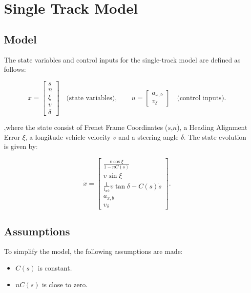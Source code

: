 \chapter{Single Track Model} \label{ch:sin_tra_mod}

\section{Model}

The state variables and control inputs for the single-track model are defined as follows:

\[
	x = \begin{bmatrix}
		s \\ n \\ \xi \\ v \\ \delta
	\end{bmatrix}
	\quad \text{(state variables)},
	\qquad
	u = \begin{bmatrix}
		a_{x,b} \\ v_\delta
	\end{bmatrix}
	\quad \text{(control inputs)}.
\]

,where the state consist of Frenet Frame Coordinates ($s$,$n$), a Heading Alignment Error $\xi$, a longitude vehicle velocity $v$ and a
steering angle $\delta$.
The state evolution is given by:

\[
	\dot{x} =
	\begin{bmatrix}
		\frac{v \cos\xi}{1 - nC(s)}                \\[8pt]
		v \sin\xi                                  \\[8pt]
		\frac{1}{l_{wb}}v \tan\delta - C(s)\dot{s} \\[8pt]
		a_{x,b}                                    \\[8pt]
		v_\delta
	\end{bmatrix}.
\]

\section{Assumptions}

To simplify the model, the following assumptions are made:

\begin{itemize}
	\item $C(s)$ is constant.
	\item $nC(s)$ is close to zero.
\end{itemize}


